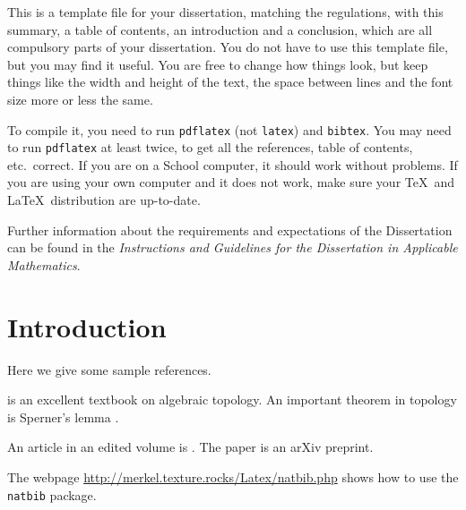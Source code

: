 \documentclass[a4paper,oneside,11pt]{report}
\begin{document}

\dissertationtitlepage


\begin{dissertationsummary}
  This is a template file for your dissertation, matching the regulations,
  with this summary, a table of contents, an introduction and a conclusion,
  which are all compulsory parts of your dissertation. You do not have to
  use this template file, but you may find it useful. You are free to
  change how things look, but keep things like the width and height of the
  text, the space between lines and the font size more or less the same.

  To compile it, you need to run \texttt{pdflatex} (not \texttt{latex}) and
  \texttt{bibtex}. You may need to run \texttt{pdflatex} at least twice, to
  get all the references, table of contents, etc.\ correct. If you are on
  a School computer, it should work without problems. If you are using your
  own computer and it does not work, make sure your \TeX\ and \LaTeX\
  distribution are up-to-date.

  Further information about the requirements and expectations of the
  Dissertation can be found in the \textit{Instructions and Guidelines for
    the Dissertation in Applicable Mathematics}.
\end{dissertationsummary}


\dissertationtableofcontents


\chapter{Introduction}

Here we give some sample references.

\cite{munkres1} is an excellent textbook on algebraic topology.
An important theorem in topology is Sperner's lemma
\citep[Theorem~1]{sperner}.

An article in an edited volume is \cite{BrownvonN1950}.
The paper \cite{ivanov2009} is an arXiv preprint.

The webpage
\url{http://merkel.texture.rocks/Latex/natbib.php} 
shows how to use the \texttt{natbib} package.
\end{document}
